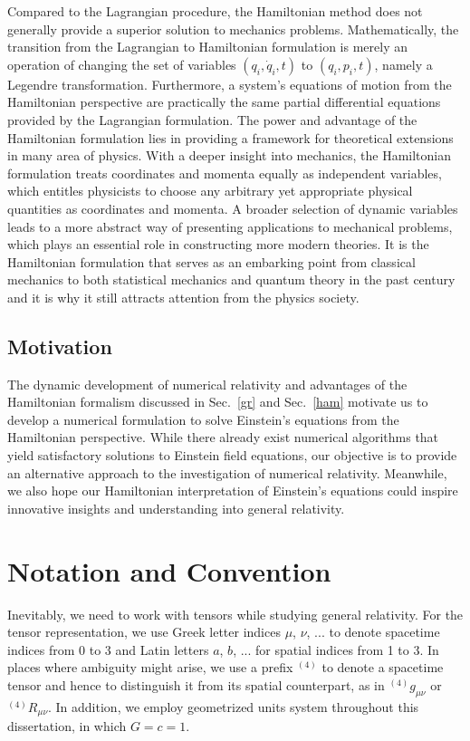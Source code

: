 Compared to the Lagrangian procedure, the Hamiltonian method does not generally provide a superior solution to mechanics problems. Mathematically, the transition from the Lagrangian to Hamiltonian formulation is merely an operation of changing the set of variables $(q_{i}, {\dot q}_{i}, t)$ to $(q_{i}, p_{i}, t)$, namely a Legendre transformation. Furthermore, a system's equations of motion from the Hamiltonian perspective are practically the same partial differential equations provided by the Lagrangian formulation. The power and advantage of the Hamiltonian formulation lies in providing a framework for theoretical extensions in many area of physics. With a deeper insight into mechanics, the Hamiltonian formulation treats coordinates and momenta equally as independent variables, which entitles physicists to choose any arbitrary yet appropriate physical quantities as coordinates and momenta. A broader selection of dynamic variables leads to a more abstract way of presenting applications to mechanical problems, which plays an essential role in constructing more modern theories. It is the Hamiltonian formulation that serves as an embarking point from classical mechanics to both statistical mechanics and quantum theory in the past century and it is why it still attracts attention from the physics society\cite{goldstein}. 
\subsection{Motivation}
The dynamic development of numerical relativity and advantages of the Hamiltonian formalism discussed in Sec.~\ref{gr} and Sec.~\ref{ham} motivate us to develop a numerical formulation to solve Einstein's equations from the Hamiltonian perspective. While there already exist numerical algorithms that yield satisfactory solutions to Einstein field equations, our objective is to provide an alternative approach to the investigation of numerical relativity. Meanwhile, we also hope our Hamiltonian interpretation of Einstein's equations could inspire innovative insights and understanding into general relativity. 
\section{Notation and Convention}\label{notation}
Inevitably, we need to work with tensors while studying general relativity. For the tensor representation, we use Greek letter indices $\mu$, $\nu$, ... to denote spacetime indices from 0 to 3 and Latin letters $a$, $b$, ... for spatial indices from 1 to 3. In places where ambiguity might arise, we use a prefix $^{(4)}$ to denote a spacetime tensor and hence to distinguish it from its spatial counterpart, as in $^{(4)}g_{\mu\nu}$ or $^{(4)}R_{\mu\nu}$. In addition, we employ geometrized  units system throughout this dissertation, in which $G = c = 1$.


